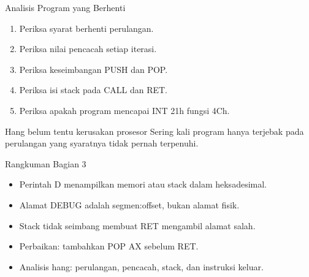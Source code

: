 \documentclass[aspectratio=169,11pt]{beamer}
\begin{document}
\begin{frame}{Analisis Program yang Berhenti}
\small
\begin{enumerate}
    \item Periksa syarat berhenti perulangan.
    \item Periksa nilai pencacah setiap iterasi.
    \item Periksa keseimbangan PUSH dan POP.
    \item Periksa isi stack pada CALL dan RET.
    \item Periksa apakah program mencapai INT 21h fungsi 4Ch.
\end{enumerate}

\vspace{0.2em}
\begin{alertblock}{Hang belum tentu kerusakan prosesor}
\small Sering kali program hanya terjebak pada perulangan yang
syaratnya tidak pernah terpenuhi.
\end{alertblock}
\end{frame}

\begin{frame}{Rangkuman Bagian 3}
\small
\begin{itemize}
    \item Perintah D menampilkan memori atau stack dalam
          heksadesimal.

    \vspace{0.15em}
    \item Alamat DEBUG adalah segmen:offset, bukan alamat fisik.

    \vspace{0.15em}
    \item Stack tidak seimbang membuat RET mengambil alamat salah.

    \vspace{0.15em}
    \item Perbaikan: tambahkan POP AX sebelum RET.

    \vspace{0.15em}
    \item Analisis hang: perulangan, pencacah, stack, dan instruksi
          keluar.
\end{itemize}
\end{frame}
\end{document}
